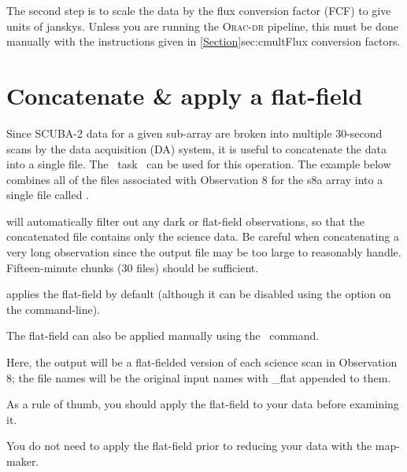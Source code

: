 \documentclass[11pt,oneside,chapters]{starlink}
\begin{document}
The second step is to scale the data by the flux conversion factor
(FCF) to give units of janskys. Unless you are running the
\textsc{Orac-dr} pipeline, this must be done manually with the
instructions given in \cref{Section}{sec:cmult}{Flux conversion
factors}.


\section{Concatenate \& apply a flat-field}
\label{sec:concat}

Since SCUBA-2 data for a given sub-array are broken into multiple
30-second scans by the data acquisition (DA) system, it is useful to
concatenate the data into a single file. The \smurf\ task \concat\ can
be used for this operation. The example below combines all of the
files associated with Observation 8 for the s8a array into a single
file called .

\begin{terminalv}
\end{terminalv}
 will automatically filter out any dark or flat-field
observations, so that the concatenated file contains only the science
data. Be careful when concatenating a very long observation since the
output file may be too large to reasonably handle. Fifteen-minute
chunks (30 files) should be sufficient.

 applies the flat-field by default (although it can be
disabled using the  option on the command-line).

The flat-field can also be applied manually using the \flatfield\ command.

\begin{terminalv}
\end{terminalv}
Here, the output will be a flat-fielded version of each science scan
in Observation 8; the file names will be the original input
names with \_flat appended to them.

As a rule of thumb, you should apply the flat-field to your data
before examining it.


\begin{tip}
You do not need to apply the flat-field prior to reducing your
data with the map-maker.
\end{tip}

\end{document}
